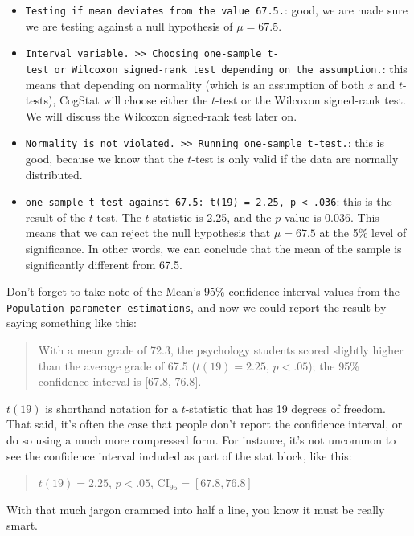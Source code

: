 \documentclass[
]{book}
\providecommand{\tightlist}{%
  \setlength{\itemsep}{0pt}\setlength{\parskip}{0pt}}
\theoremstyle{definition}
\theoremstyle{definition}
\theoremstyle{definition}
\theoremstyle{definition}
\theoremstyle{remark}
\begin{document}
\begin{itemize}
\tightlist
\item
  \texttt{Testing\ if\ mean\ deviates\ from\ the\ value\ 67.5.}: good, we are made sure we are testing against a null hypothesis of \(\mu = 67.5\).
\item
  \texttt{Interval\ variable.\ \textgreater{}\textgreater{}\ Choosing\ one-sample\ t-test\ or\ Wilcoxon\ signed-rank\ test\ depending\ on\ the\ assumption.}: this means that depending on normality (which is an assumption of both \(z\) and \(t\)-tests), CogStat will choose either the \(t\)-test or the Wilcoxon signed-rank test. We will discuss the Wilcoxon signed-rank test later on.
\item
  \texttt{Normality\ is\ not\ violated.\ \textgreater{}\textgreater{}\ Running\ one-sample\ t-test.}: this is good, because we know that the \(t\)-test is only valid if the data are normally distributed.
\item
  \texttt{one-sample\ t-test\ against\ 67.5:\ t(19)\ =\ 2.25,\ p\ \textless{}\ .036}: this is the result of the \(t\)-test. The \(t\)-statistic is 2.25, and the \(p\)-value is 0.036. This means that we can reject the null hypothesis that \(\mu = 67.5\) at the 5\% level of significance. In other words, we can conclude that the mean of the sample is significantly different from 67.5.
\end{itemize}

Don't forget to take note of the Mean's 95\% confidence interval values from the \texttt{Population\ parameter\ estimations}, and now we could report the result by saying something like this:

\begin{quote}
With a mean grade of 72.3, the psychology students scored slightly higher than the average grade of 67.5 (\(t(19) = 2.25\), \(p<.05\)); the 95\% confidence interval is {[}67.8, 76.8{]}.
\end{quote}

\(t(19)\) is shorthand notation for a \(t\)-statistic that has 19 degrees of freedom. That said, it's often the case that people don't report the confidence interval, or do so using a much more compressed form. For instance, it's not uncommon to see the confidence interval included as part of the stat block, like this:

\begin{quote}
\(t(19) = 2.25\), \(p<.05\), CI\(_{95} = [67.8, 76.8]\)
\end{quote}

With that much jargon crammed into half a line, you know it must be really smart.
\end{document}
